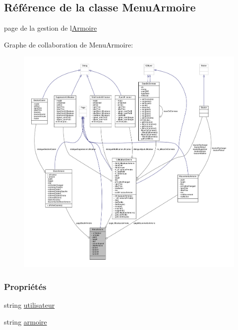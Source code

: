 \hypertarget{class_menu_armoire}{}\subsection{Référence de la classe Menu\+Armoire}
\label{class_menu_armoire}


page de la gestion de l\textquotesingle{}\hyperlink{class_armoire}{Armoire}  




Graphe de collaboration de Menu\+Armoire\+:\nopagebreak
\begin{figure}[H]
\begin{center}
\leavevmode
\includegraphics[width=350pt]{class_menu_armoire__coll__graph}
\end{center}
\end{figure}
\subsubsection*{Propriétés}
\begin{DoxyCompactItemize}
\item 
string \hyperlink{class_menu_armoire_a6f03b3bcf08a6beeea294af5848f14bc}{utilisateur}
\item 
string \hyperlink{class_menu_armoire_aae5bb1f150da3b193d8e0d15038d708e}{armoire}
\end{DoxyCompactItemize}
